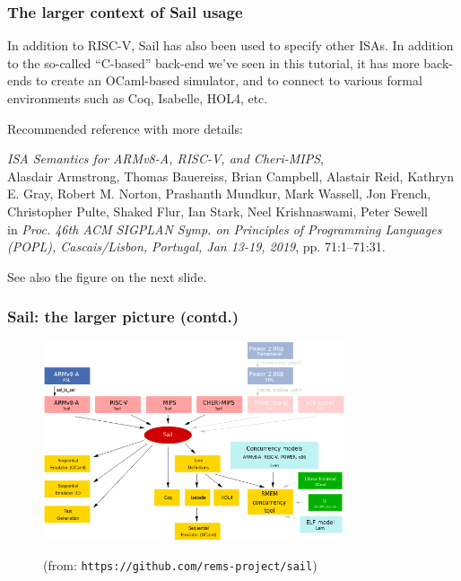 \documentclass[aspectratio=169]{beamer}
\newcommand{\slidefont}{\scriptsize}
\begin{document}
\begin{frame}[fragile]
  \frametitle{The larger context of Sail usage}

  \slidefont

  In addition to RISC-V, Sail has also been used to specify other
  ISAs.  In addition to the so-called ``C-based'' back-end we've seen
  in this tutorial, it has more back-ends to create an OCaml-based
  simulator, and to connect to various formal environments such as
  Coq, Isabelle, HOL4, etc.

  \vspace{2ex}

  Recommended reference with more details:
  
  \vspace{2ex}

  \hfill \begin{minipage}{0.95\textwidth}
    \emph{ISA Semantics for ARMv8-A, RISC-V, and Cheri-MIPS}, \\
    Alasdair Armstrong,
    Thomas Bauereiss,
    Brian Campbell,
    Alastair Reid,
    Kathryn E. Gray,
    Robert M. Norton,
    Prashanth Mundkur,
    Mark Wassell,
    Jon French,
    Christopher Pulte,
    Shaked Flur,
    Ian Stark,
    Neel Krishnaswami,
    Peter Sewell \\
    in \emph{Proc. 46th ACM SIGPLAN Symp. on Principles of Programming
    Languages (POPL), Cascais/Lisbon, Portugal, Jan 13-19, 2019},
    pp. 71:1--71:31.
  \end{minipage}

  \vspace{2ex}

  See also the figure on the next slide.
\end{frame}


\begin{frame}[fragile]
  \frametitle{Sail: the larger picture (contd.)}

  \begin{figure}[htbp]
    \centerline{\includegraphics[height=2.3in]{Figures/overview-sail.png}}
    {\scriptsize (from: {\tt https://github.com/rems-project/sail})}
  \end{figure}

\end{frame}
\end{document}
